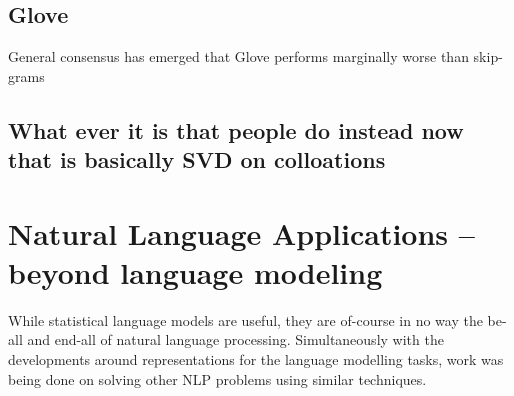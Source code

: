 \documentclass[parskip]{komatufte}
\begin{document}

\subsection{Glove}

General consensus has emerged that Glove performs marginally worse than skip-grams

\subsection{What ever it is that people do instead now that is basically SVD on colloations}


\section{Natural Language Applications -- beyond language modeling}
While statistical language models are useful, they are of-course in no way the be-all and end-all of natural language processing.
Simultaneously with the developments around representations for the language modelling tasks, work was being done on solving other NLP problems using similar techniques.







\clearnotecolumn[notes]
\end{document}
